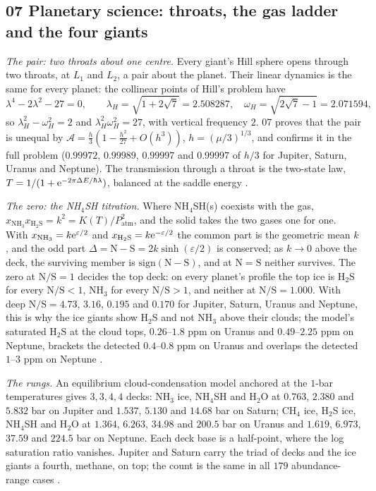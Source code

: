 \documentclass[11pt]{article}
\theoremstyle{definition}\newtheorem{definition}[theorem]{Definition}
\theoremstyle{remark}\newtheorem{remark}[theorem]{Remark}
\begin{document}
\subsection{07 Planetary science: throats, the gas ladder and the four giants}\label{sec:f07}
\emph{The pair: two throats about one centre.} Every giant's Hill sphere opens through two throats, at $L_1$ and $L_2$, a pair about the planet. Their linear dynamics is the same for every planet: the collinear points of Hill's problem have
\[
\lambda^4-2\lambda^2-27=0,\qquad \lambda_H=\sqrt{1+2\sqrt7}=2.508287,\quad \omega_H=\sqrt{2\sqrt7-1}=2.071594,
\]
so $\lambda_H^2-\omega_H^2=2$ and $\lambda_H^2\omega_H^2=27$, with vertical frequency $2$. 07 proves that the pair is unequal by $\mathcal A=\frac h3(1-\frac{h^2}{27}+O(h^3))$, $h=(\mu/3)^{1/3}$, and confirms it in the full problem ($0.99972$, $0.99989$, $0.99997$ and $0.99997$ of $h/3$ for Jupiter, Saturn, Uranus and Neptune). The transmission through a throat is the two-state law, $T=1/(1+\mathrm e^{-2\pi\Delta E/\hbar\lambda})$, balanced at the saddle energy \cite{SPlanet}.

\emph{The zero: the NH$_4$SH titration.} Where NH$_4$SH(s) coexists with the gas, $x_{\mathrm{NH_3}}x_{\mathrm{H_2S}}=k^2=K(T)/P_{\mathrm{atm}}^2$, and the solid takes the two gases one for one. With $x_{\mathrm{NH_3}}=k\mathrm e^{\varepsilon/2}$ and $x_{\mathrm{H_2S}}=k\mathrm e^{-\varepsilon/2}$ the common part is the geometric mean $k$, and the odd part $\Delta=\mathrm N-\mathrm S=2k\sinh(\varepsilon/2)$ is conserved; as $k\to0$ above the deck, the surviving member is $\mathrm{sign}(\mathrm N-\mathrm S)$, and at $\mathrm N=\mathrm S$ neither survives. The zero at $\mathrm N/\mathrm S=1$ decides the top deck: on every planet's profile the top ice is H$_2$S for every $\mathrm N/\mathrm S<1$, NH$_3$ for every $\mathrm N/\mathrm S>1$, and neither at $\mathrm N/\mathrm S=1.000$. With deep $\mathrm N/\mathrm S=4.73$, $3.16$, $0.195$ and $0.170$ for Jupiter, Saturn, Uranus and Neptune, this is why the ice giants show H$_2$S and not NH$_3$ above their clouds; the model's saturated H$_2$S at the cloud tops, $0.26$--$1.8$ ppm on Uranus and $0.49$--$2.25$ ppm on Neptune, brackets the detected $0.4$--$0.8$ ppm on Uranus and overlaps the detected $1$--$3$ ppm on Neptune \cite{SPlanet}.

\emph{The rungs.} An equilibrium cloud-condensation model anchored at the $1$-bar temperatures gives $3,3,4,4$ decks: NH$_3$ ice, NH$_4$SH and H$_2$O at $0.763$, $2.380$ and $5.832$ bar on Jupiter and $1.537$, $5.130$ and $14.68$ bar on Saturn; CH$_4$ ice, H$_2$S ice, NH$_4$SH and H$_2$O at $1.364$, $6.263$, $34.98$ and $200.5$ bar on Uranus and $1.619$, $6.973$, $37.59$ and $224.5$ bar on Neptune. Each deck base is a half-point, where the log saturation ratio vanishes. Jupiter and Saturn carry the triad of decks and the ice giants a fourth, methane, on top; the count is the same in all $179$ abundance-range cases \cite{SPlanet}.
\end{document}
